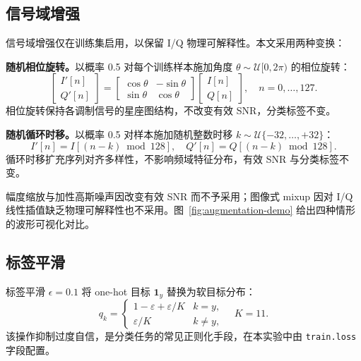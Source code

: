 \subsection{信号域增强}

信号域增强仅在训练集启用，以保留 I/Q 物理可解释性。本文采用两种变换：

\textbf{随机相位旋转。}以概率 0.5 对每个训练样本施加角度 \(\theta\sim\mathcal{U}[0,2\pi)\) 的相位旋转：
\begin{equation}
  \begin{bmatrix}I'[n]\\Q'[n]\end{bmatrix}
  =\begin{bmatrix}\cos\theta & -\sin\theta\\\sin\theta & \cos\theta\end{bmatrix}
  \begin{bmatrix}I[n]\\Q[n]\end{bmatrix},\quad n=0,\ldots,127.
  \label{eq:phase-rotation}
\end{equation}
相位旋转保持各调制信号的星座图结构，不改变有效 SNR，分类标签不变。

\textbf{随机循环时移。}以概率 0.5 对样本施加随机整数时移 \(k\sim\mathcal{U}\{-32,\ldots,+32\}\)：
\begin{equation}
  I'[n]=I[(n-k)\bmod 128],\quad Q'[n]=Q[(n-k)\bmod 128].
  \label{eq:cyclic-shift}
\end{equation}
循环时移扩充序列对齐多样性，不影响频域特征分布，有效 SNR 与分类标签不变。

幅度缩放与加性高斯噪声因改变有效 SNR 而不予采用；图像式 mixup 因对 I/Q 线性插值缺乏物理可解释性\cite{huang2022mixingsignals,shorten2019dataaug}也不采用。图~\ref{fig:augmentation-demo} 给出四种情形的波形可视化对比。

\subsection{标签平滑}

标签平滑 \(\epsilon=0.1\)\cite{szegedy2016inception} 将 one-hot 目标 \(\mathbf{1}_{y}\) 替换为软目标分布：
\begin{equation}
  q_k=\begin{cases}1-\varepsilon+\varepsilon/K & k=y,\\
  \varepsilon/K & k\neq y,\end{cases}
  \quad K=11.
  \label{eq:label-smoothing}
\end{equation}
该操作抑制过度自信，是分类任务的常见正则化手段，在本实验中由 \texttt{train.loss} 字段配置。

